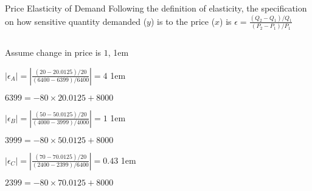 \documentclass[11pt,aspectratio=43,usenames,dvipsnames]{beamer}
\let\olditemize=\itemize
\let\endolditemize=\enditemize
\renewenvironment{itemize}{\olditemize \itemsep1em}{\endolditemize}
\theoremstyle{definition}
\begin{document}
\begin{frame}{Price Elasticity of Demand}
\label{slide:Price_Elasticity_of_Demand}
    Following the definition of elasticity, the specification on \alert{how sensitive quantity demanded ($y$) is to the price ($x$)} is $ \displaystyle \epsilon = \frac{(Q_{2} - Q_{1})/Q_{1}}{(P_{2} - P_{1}) / P_{1}} $
    \begin{columns}
        \begin{column}{0.5\textwidth}
            Assume change in price is $ 1 $,
            \begin{itemize}
                \item $ |\epsilon_{A}| = \left|\frac{(20 - 20.0125 )/20}{(6400-6399)/6400}\right| = 4$
                \begin{itemize}
                    \item $6399 = -80 \times 20.0125 + 8000$
                \end{itemize}
                \item $ |\epsilon_{B}| = \left|\frac{(50 - 50.0125 )/20}{(4000-3999)/4000}\right| = 1$
                \begin{itemize}
                    \item $3999 = -80 \times 50.0125 + 8000$
                \end{itemize}
                \item $ |\epsilon_{C}| = \left|\frac{(70 - 70.0125 )/20}{(2400-2399)/6400}\right| = 0.43$
                \begin{itemize}
                    \item $2399 = -80 \times 70.0125 + 8000$
                \end{itemize}

            \end{itemize}

        \end{column}
        \begin{column}{0.5\textwidth}
            \begin{figure}
                \centering
                
            \end{figure}
        \end{column}
    \end{columns}


\end{frame}
\end{document}
